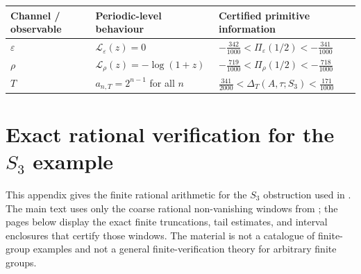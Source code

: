 \documentclass[11pt,a4paper]{amsart}
\theoremstyle{plain}
\theoremstyle{definition}
\theoremstyle{remark}
\begin{document}
\begin{center}
\footnotesize
\begin{tabular}{@{}p{}p{}p{}@{}}
\toprule
Channel / observable & Periodic-level behaviour & Certified primitive information \\
\midrule
\(\varepsilon\) &
\(\mathcal L_\varepsilon(z)=0\) &
\(-\frac{342}{1000}<\Pi_\varepsilon(1/2)<-\frac{341}{1000}\) \\
\(\rho\) &
\(\mathcal L_\rho(z)=-\log(1+z)\) &
\(-\frac{719}{1000}<\Pi_\rho(1/2)<-\frac{718}{1000}\) \\
\(T\) &
\(a_{n,T}=2^{n-1}\) for all \(n\) &
\(\frac{341}{2000}<\Delta_T(A,\tau;S_3)<\frac{171}{1000}\) \\
\bottomrule
\end{tabular}
\end{center}


\section[Exact rational verification for the S3 example]{Exact
  rational verification for the \texorpdfstring{$S_3$}{S3}
  example}
\label{app:s3-log-certificates}

This appendix gives the finite rational arithmetic for the \(S_3\) obstruction used in
.
The main text uses only the coarse rational non-vanishing windows from
; the pages below display the exact
finite truncations, tail estimates, and interval enclosures that certify those
windows.  The material is not a catalogue of finite-group examples and not a
general finite-verification theory for arbitrary finite groups.
\end{document}
